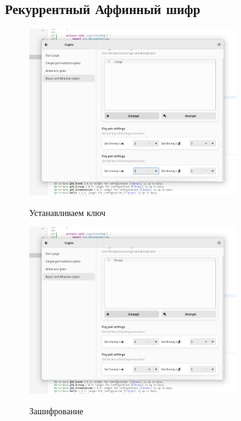 \documentclass[a4paper]{article}
\begin{document}
  \subsection{Рекуррентный Аффинный шифр}

  \begin{figure}[H]  
    \centering
    \caption{Устанавливаем ключ}
    \includegraphics[width=0.8\textwidth]{01_0009}
    \label{img:0009}
  \end{figure}

  \begin{figure}[H]  
    \centering
    \caption{Зашифрование}
    \includegraphics[width=0.8\textwidth]{01_0010}
    \label{img:0010}
  \end{figure}
\end{document}
